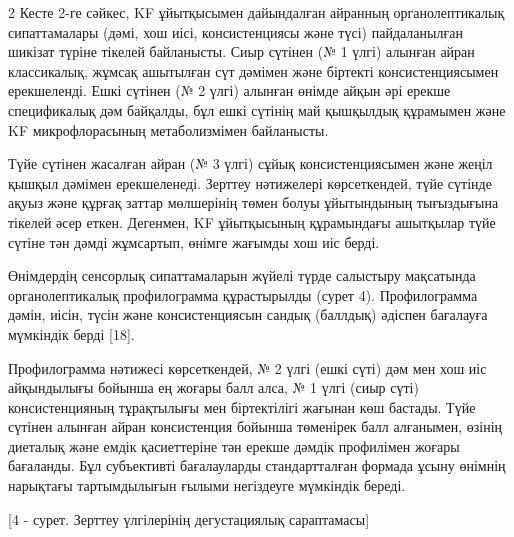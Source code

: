 \begin{multicols}{2}
Кесте 2-ге сәйкес, KF ұйытқысымен дайындалған айранның органолептикалық
сипаттамалары (дәмі, хош иісі, консистенциясы және түсі) пайдаланылған
шикізат түріне тікелей байланысты. Сиыр сүтінен (№ 1 үлгі) алынған айран
классикалық, жұмсақ ашытылған сүт дәмімен және біртекті
консистенциясымен ерекшеленді. Ешкі сүтінен (№ 2 үлгі) алынған өнімде
айқын әрі ерекше спецификалық дәм байқалды, бұл ешкі сүтінің май
қышқылдық құрамымен және KF микрофлорасының метаболизмімен байланысты.

Түйе сүтінен жасалған айран (№ 3 үлгі) сұйық консистенциясымен және
жеңіл қышқыл дәмімен ерекшеленеді. Зерттеу нәтижелері көрсеткендей, түйе
сүтінде ақуыз және құрғақ заттар мөлшерінің төмен болуы ұйытындының
тығыздығына тікелей әсер еткен. Дегенмен, KF ұйытқысының құрамындағы
ашытқылар түйе сүтіне тән дәмді жұмсартып, өнімге жағымды хош иіс берді.

Өнімдердің сенсорлық сипаттамаларын жүйелі түрде салыстыру мақсатында
органолептикалық профилограмма құрастырылды (сурет 4). Профилограмма
дәмін, иісін, түсін және консистенциясын сандық (баллдық) әдіспен
бағалауға мүмкіндік берді {[}18{]}.

Профилограмма нәтижесі көрсеткендей, № 2 үлгі (ешкі сүті) дәм мен хош
иіс айқындылығы бойынша ең жоғары балл алса, № 1 үлгі (сиыр сүті)
консистенцияның тұрақтылығы мен біртектілігі жағынан көш бастады. Түйе
сүтінен алынған айран консистенция бойынша төменірек балл алғанымен,
өзінің диеталық және емдік қасиеттеріне тән ерекше дәмдік профилімен
жоғары бағаланды. Бұл субъективті бағалауларды стандартталған формада
ұсыну өнімнің нарықтағы тартымдылығын ғылыми негіздеуге мүмкіндік
береді.
\end{multicols}

[4 - сурет. Зерттеу үлгілерінің дегустациялық сараптамасы]

